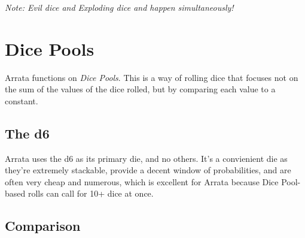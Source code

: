 \documentclass[../main.tex]{subfiles}
\begin{document}
    {\em Note: Evil dice and Exploding dice and happen simultaneously!}

    \section{Dice Pools}

    Arrata functions on {\em Dice Pools}. This is a way of rolling dice that focuses not on the sum of the values of the dice rolled, but by comparing each value to a constant.

    \subsection{The d6}

    Arrata uses the d6 as its primary die, and no others. It's a convienient die as they're extremely stackable, provide a decent window of probabilities, and are often very cheap and numerous, which is excellent for Arrata because Dice Pool-based rolls can call for 10+ dice at once.

    \subsection{Comparison}
\end{document}
